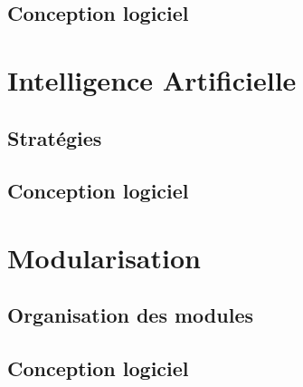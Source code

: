 \documentclass[a4paper,12pt]{article}
\begin{document}
\clearpage
\subsection{Conception logiciel}




\section{Intelligence Artificielle}

\subsection{Stratégies}

\clearpage
\subsection{Conception logiciel}




\section{Modularisation}
\label{sec:module}

\subsection{Organisation des modules}

\clearpage
\subsection{Conception logiciel}


%
\end{document}
